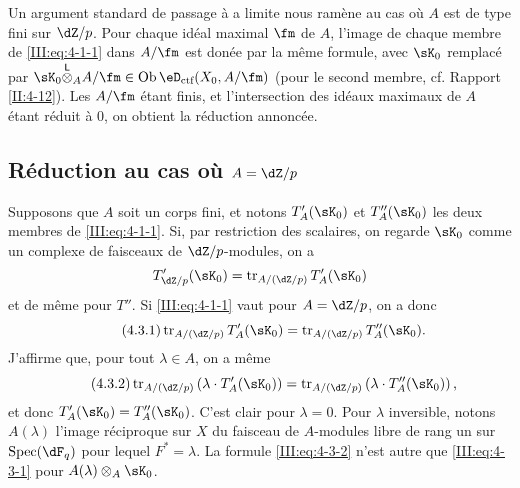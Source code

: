 Un argument standard de passage à a limite nous ramène au cas où $A$ est 
de type fini sur $\dZ/p$. Pour chaque idéal maximal $\fm$ de $A$, l'image de 
chaque membre de \eqref{III:eq:4-1-1} dans $A/\fm$ est donée par la même 
formule, avec $\sK_0$ remplacé par 
$\sK_0\lotimes_A A/\fm\in\ob\eD_\text{ctf}(X_0,A/\fm)$ (pour le second membre, 
cf. Rapport \ref{II:4-12}). Les $A/\fm$ étant finis, et l'intersection des 
idéaux maximaux de $A$ étant réduit à $0$, on obtient la réduction 
annoncée.





\subsection{Réduction au cas où \texorpdfstring{$A=\dZ/p$}{A=Z/p}}\label{III:4-3}

Supposons que $A$ soit un corps fini, et notons $T_A'(\sK_0)$ et $T_A''(\sK_0)$ 
les deux membres de \eqref{III:eq:4-1-1}. Si, par restriction des scalaires, on 
regarde $\sK_0$ comme un complexe de faisceaux de $\dZ/p$-modules, on a 
\[
  T_{\dZ/p}'(\sK_0) = \tr_{A/(\dZ/p)} T_A'(\sK_0)
\]
et de même pour $T''$. Si \eqref{III:eq:4-1-1} vaut pour $A=\dZ/p$, on a donc 
\begin{equation*}\tag{4.3.1}\label{III:eq:4-3-1}
  \tr_{A/(\dZ/p)} T_A'(\sK_0) = \tr_{A/(\dZ/p)} T_A''(\sK_0) \text{.}
\end{equation*}
J'affirme que, pour tout $\lambda\in A$, on a même 
\begin{equation*}\tag{4.3.2}\label{III:eq:4-3-2}
  \tr_{A/(\dZ/p)}\left(\lambda\cdot T_A'(\sK_0)\right) = \tr_{A/(\dZ/p)}\left(\lambda\cdot T_A''(\sK_0)\right) \text{,}
\end{equation*}
et donc $T_A'(\sK_0) = T_A''(\sK_0)$. C'est clair pour $\lambda=0$. Pour 
$\lambda$ inversible, notons $A(\lambda)$ l'image réciproque sur $X$ du 
faisceau de $A$-modules libre de rang un sur $\spec(\dF_q)$ pour lequel 
$F^*=\lambda$. La formule \eqref{III:eq:4-3-2} n'est autre que 
\eqref{III:eq:4-3-1} pour $A(\lambda)\otimes_A \sK_0$. 





